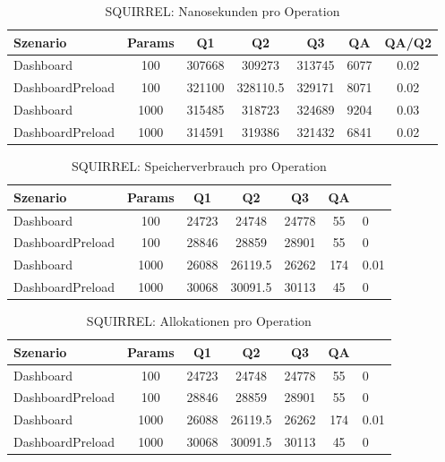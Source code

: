 
\begin{table}[ht]
\centering
\caption{SQUIRREL: Nanosekunden pro Operation}
\begin{tabular}{lcccccc}
\toprule
Szenario & Params & Q1 & Q2 & Q3 & QA & QA/Q2 \\
\midrule
	Dashboard & 100 & 307668 & 309273 & 313745 & 6077 & 0.02 \\
	DashboardPreload & 100 & 321100 & 328110.5 & 329171 & 8071 & 0.02 \\
	Dashboard & 1000 & 315485 & 318723 & 324689 & 9204 & 0.03 \\
	DashboardPreload & 1000 & 314591 & 319386 & 321432 & 6841 & 0.02 \\
\bottomrule
\end{tabular}
\label{tab:benchmark_squirrel_nsperop}
\end{table}
	
\begin{table}[ht]
\centering
\caption{SQUIRREL: Speicherverbrauch pro Operation}
\begin{tabular}{lccccc}
\toprule
Szenario & Params & Q1 & Q2 & Q3 & QA \\
\midrule
	Dashboard & 100 & 24723 & 24748 & 24778 & 55 & 0 \\
	DashboardPreload & 100 & 28846 & 28859 & 28901 & 55 & 0 \\
	Dashboard & 1000 & 26088 & 26119.5 & 26262 & 174 & 0.01 \\
	DashboardPreload & 1000 & 30068 & 30091.5 & 30113 & 45 & 0 \\
\bottomrule
\end{tabular}
\label{tab:benchmark_squirrel_bytesperop}
\end{table}
	
\begin{table}[ht]
\centering
\caption{SQUIRREL: Allokationen pro Operation}
\begin{tabular}{lccccc}
\toprule
Szenario & Params & Q1 & Q2 & Q3 & QA \\
\midrule
	Dashboard & 100 & 24723 & 24748 & 24778 & 55 & 0 \\
	DashboardPreload & 100 & 28846 & 28859 & 28901 & 55 & 0 \\
	Dashboard & 1000 & 26088 & 26119.5 & 26262 & 174 & 0.01 \\
	DashboardPreload & 1000 & 30068 & 30091.5 & 30113 & 45 & 0 \\
\bottomrule
\end{tabular}
\label{tab:benchmark_squirrel_allocsperop}
\end{table}
	